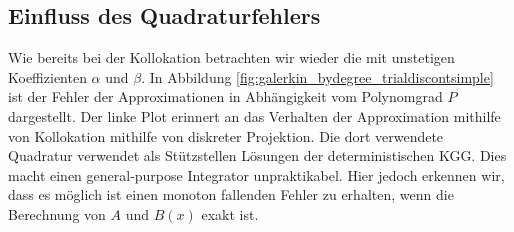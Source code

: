 \subsection{Einfluss des Quadraturfehlers}
Wie bereits bei der Kollokation betrachten wir wieder die  mit unstetigen Koeffizienten $\alpha$ und $\beta$. In Abbildung \ref{fig:galerkin_bydegree_trialdiscontsimple} ist der Fehler der Approximationen in Abhängigkeit vom Polynomgrad $P$ dargestellt. Der linke Plot erinnert an das Verhalten der Approximation mithilfe von Kollokation mithilfe von diskreter Projektion. Die dort verwendete Quadratur verwendet als Stützstellen Lösungen der deterministischen KGG. Dies macht einen general-purpose Integrator unpraktikabel. Hier jedoch erkennen wir, dass es möglich ist einen monoton fallenden Fehler zu erhalten, wenn die Berechnung von $A$ und $B(x)$ exakt ist. 

